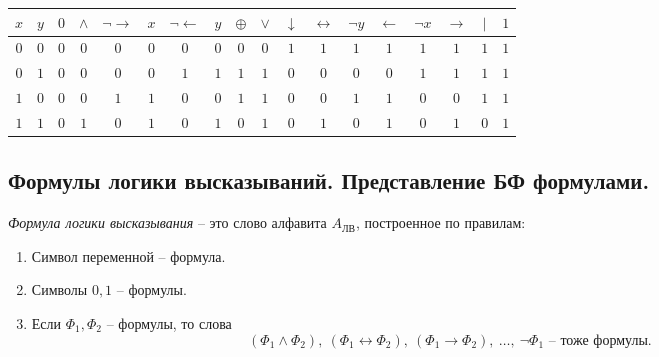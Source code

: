 \begin{note}
    \begin{center}
        \begin{tabular}{c c | c c c c c c c c c c c c c c c c}
            $x$ & $y$ & $0$ & $\land$ & $\lnot\rightarrow$ & $x$ & $\lnot\leftarrow$ & $y$ & $\oplus$ & $\lor$ & $\downarrow$ & $\leftrightarrow$ & $\lnot y$ & $\leftarrow$ & $\lnot x$ & $\rightarrow$ & $\vert$ & $1$ \\ [0.5ex]
            \hline
            $0$ & $0$ & $0$ & $0$     & $0$                & $0$ & $0$               & $0$ & $0$      & $0$    & $1$          & $1$               & $1$       & $1$          & $1$       & $1$           & $1$     & $1$ \\
            $0$ & $1$ & $0$ & $0$     & $0$                & $0$ & $1$               & $1$ & $1$      & $1$    & $0$          & $0$               & $0$       & $0$          & $1$       & $1$           & $1$     & $1$ \\
            $1$ & $0$ & $0$ & $0$     & $1$                & $1$ & $0$               & $0$ & $1$      & $1$    & $0$          & $0$               & $1$       & $1$          & $0$       & $0$           & $1$     & $1$ \\
            $1$ & $1$ & $0$ & $1$     & $0$                & $1$ & $0$               & $1$ & $0$      & $1$    & $0$          & $1$               & $0$       & $1$          & $0$       & $1$           & $0$     & $1$
        \end{tabular}
        \label{table:3}
    \end{center}
\end{note}

\subsection{Формулы логики высказываний. Представление БФ формулами.}

\begin{definition}
    \emph{Формула логики высказывания} -- это слово алфавита $A_{\text{ЛВ}}$, построенное по правилам:
    \begin{enumerate}
        \item Символ переменной -- формула.
        \item Символы $0,1$ -- формулы.
        \item Если $\Phi_1,\Phi_2$ -- формулы, то слова
              \[
                  (\Phi_1 \land \Phi_2), \ (\Phi_1 \leftrightarrow \Phi_2), \ (\Phi_1 \rightarrow \Phi_2), \ \ldots, \ \lnot\Phi_1\text{ -- тоже формулы.}
              \]
    \end{enumerate}
\end{definition}

